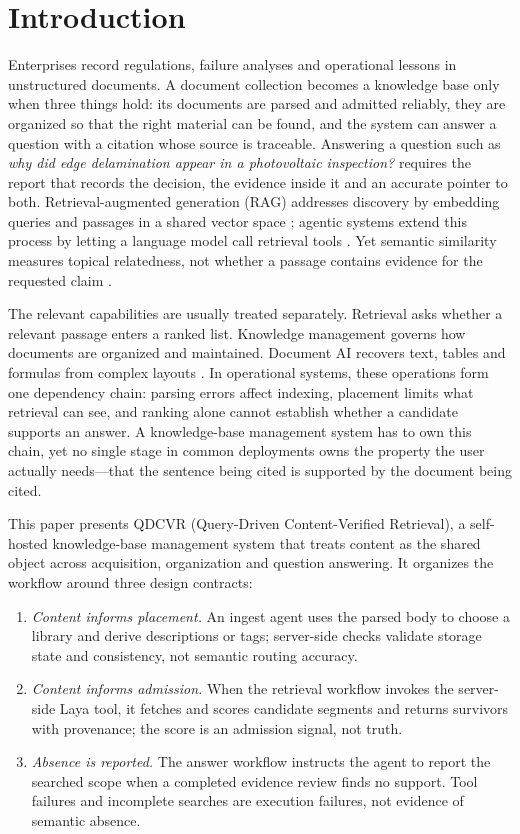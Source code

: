 \section{Introduction}
\label{sec:intro}

Enterprises record regulations, failure analyses and operational lessons in
unstructured documents. A document collection becomes a knowledge base only
when three things hold: its documents are parsed and admitted reliably, they
are organized so that the right material can be found, and the system can
answer a question with a citation whose source is traceable. Answering a
question such as \emph{why did edge delamination appear in a photovoltaic
inspection?} requires the report that records the decision, the evidence
inside it and an accurate pointer to both. Retrieval-augmented generation
(RAG) addresses discovery by embedding queries and passages in a shared vector
space \cite{rag-lewis,dpr}; agentic systems extend this process by letting a
language model call retrieval tools \cite{mcp,singh-agentic-rag}. Yet semantic
similarity measures topical relatedness, not whether a passage contains
evidence for the requested claim \cite{siren,gao-ragsurvey}.

The relevant capabilities are usually treated separately. Retrieval asks
whether a relevant passage enters a ranked list. Knowledge management governs
how documents are organized and maintained. Document AI recovers text, tables
and formulas from complex layouts \cite{mineru}. In operational systems, these
operations form one dependency chain: parsing errors affect indexing, placement
limits what retrieval can see, and ranking alone cannot establish whether a
candidate supports an answer. A knowledge-base management system has to own
this chain, yet no single stage in common deployments owns the property the
user actually needs---that the sentence being cited is supported by the
document being cited.

This paper presents QDCVR (Query-Driven Content-Verified Retrieval), a
self-hosted knowledge-base management system that treats content as the
shared object across acquisition, organization and question answering. It
organizes the workflow around three design contracts:

\begin{enumerate}
\item \emph{Content informs placement.} An ingest agent uses the parsed body
to choose a library and derive descriptions or tags; server-side checks
validate storage state and consistency, not semantic routing accuracy.
\item \emph{Content informs admission.} When the retrieval workflow invokes
the server-side Laya tool, it fetches and scores candidate segments and returns
survivors with provenance; the score is an admission signal, not truth.
\item \emph{Absence is reported.} The answer workflow instructs the agent to
report the searched scope when a completed evidence review finds no support.
Tool failures and incomplete searches are execution failures, not evidence of
semantic absence.
\end{enumerate}

